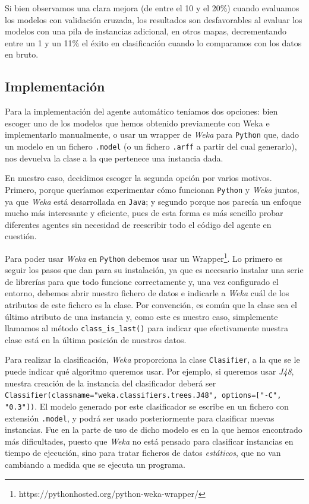 \documentclass[12pt]{article}
\begin{document}
\vspace{0.3cm}

Si bien observamos una clara mejora (de entre el 10 y el 20\%) cuando evaluamos los modelos con validación cruzada, los resultados son desfavorables al evaluar los modelos con una pila de instancias adicional, en otros mapas, decrementando entre un 1 y un 11\% el éxito en clasificación cuando lo comparamos con los datos en bruto.

\subsection{Implementación}

Para la implementación del agente automático teníamos dos opciones: bien escoger uno de los modelos que hemos obtenido previamente con Weka e implementarlo manualmente, o usar un wrapper de \emph{Weka} para \texttt{Python} que, dado un modelo en un fichero \texttt{.model} (o un fichero \texttt{.arff} a partir del cual generarlo), nos devuelva la clase a la que pertenece una instancia dada.

En nuestro caso, decidimos escoger la segunda opción por varios motivos. Primero, porque queríamos experimentar cómo funcionan \texttt{Python} y \emph{Weka} juntos, ya que \emph{Weka} está desarrollada en \texttt{Java}; y segundo porque nos parecía un enfoque mucho más interesante y eficiente, pues de esta forma es más sencillo probar diferentes agentes sin necesidad de reescribir todo el código del agente en cuestión.

Para poder usar \emph{Weka} en \texttt{Python} debemos usar un Wrapper\footnote{https://pythonhosted.org/python-weka-wrapper/}. Lo primero es seguir los pasos que dan para su instalación, ya que es necesario instalar una serie de librerías para que todo funcione correctamente y, una vez configurado el entorno, debemos abrir nuestro fichero de datos e indicarle a \emph{Weka} cuál de los atributos de este fichero es la clase. Por convención, es común que la clase sea el último atributo de una instancia y, como este es nuestro caso, simplemente llamamos al método \texttt{class\_is\_last()} para indicar que efectivamente nuestra clase está en la última posición de nuestros datos.

Para realizar la clasificación, \emph{Weka} proporciona la clase \texttt{Clasifier}, a la que se le puede indicar qué algoritmo queremos usar. Por ejemplo, si queremos usar \emph{J48}, nuestra creación de la instancia del clasificador deberá ser \texttt{Classifier(classname="weka.classifiers.trees.J48", options=["-C", "0.3"])}. El modelo generado por este clasificador se escribe en un fichero con extensión \texttt{.model}, y podrá ser usado posteriormente para clasificar nuevas instancias. Fue en la parte de uso de dicho modelo es en la que hemos encontrado más dificultades, puesto que \emph{Weka} no está pensado para clasificar instancias en tiempo de ejecución, sino para tratar ficheros de datos \emph{estáticos}, que no van cambiando a medida que se ejecuta un programa.
\end{document}
